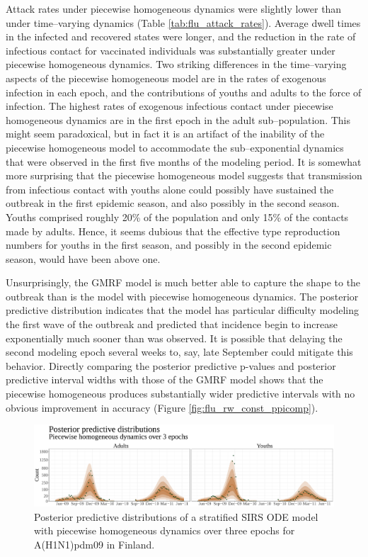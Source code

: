 Attack rates under piecewise homogeneous dynamics were slightly lower than under time--varying dynamics (Table \ref{tab:flu_attack_rates}). Average dwell times in the infected and recovered states were longer, and the reduction in the rate of infectious contact for vaccinated individuals was substantially greater under piecewise homogeneous dynamics. Two striking differences in the time--varying aspects of the piecewise homogeneous model are in the rates of exogenous infection in each epoch, and the contributions of youths and adults to the force of infection. The highest rates of exogenous infectious contact under piecewise homogeneous dynamics are in the first epoch in the adult sub--population. This might seem paradoxical, but in fact it is an artifact of the inability of the piecewise homogeneous model to accommodate the sub--exponential dynamics that were observed in the first five months of the modeling period. It is somewhat more surprising that the piecewise homogeneous model suggests that transmission from infectious contact with youths alone could possibly have sustained the outbreak in the first epidemic season, and also possibly in the second season. Youths comprised roughly 20\% of the population and only 15\% of the contacts made by adults. Hence, it seems dubious that the effective type reproduction numbers for youths in the first season, and possibly in the second epidemic season, would have been above one. 

Unsurprisingly, the GMRF model is much better able to capture the shape to the outbreak than is the model with piecewise homogeneous dynamics. The posterior predictive distribution indicates that the model has particular difficulty modeling the first wave of the outbreak and predicted that incidence begin to increase exponentially much sooner than was observed. It is possible that delaying the second modeling epoch several weeks to, say, late September could mitigate this behavior. Directly comparing the posterior predictive p-values and posterior predictive interval widths with those of the GMRF model shows that the piecewise homogeneous produces substantially wider predictive intervals with no obvious improvement in accuracy (Figure \ref{fig:flu_rw_const_ppicomp}).

\begin{figure}[htbp]
	\centering
	\includegraphics[width=\linewidth]{figures/flu_postpreds_const_ode}
	\caption{Posterior predictive distributions of a stratified SIRS ODE model with piecewise homogeneous dynamics over three epochs for A(H1N1)pdm09 in Finland.}
	\label{fig:flupostpredsconstode}
\end{figure}

